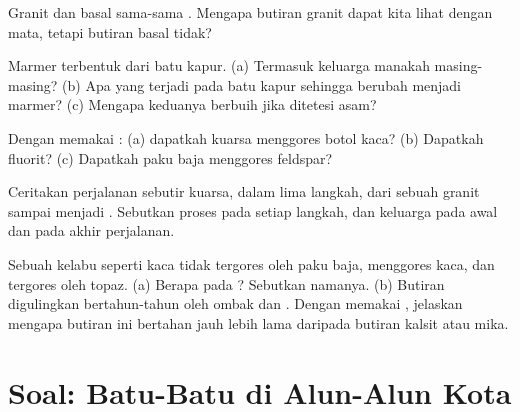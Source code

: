 \begin{exercise}[$\star\star$]\label{exo:g6:rocks-and-minerals:8}
Granit dan basal sama-sama . Mengapa butiran granit dapat kita
lihat dengan mata, tetapi butiran basal tidak?
\end{exercise}

\begin{exercise}[$\star\star$]\label{exo:g6:rocks-and-minerals:9}
Marmer terbentuk dari batu kapur. (a) Termasuk keluarga manakah
masing-masing? (b) Apa yang terjadi pada batu kapur sehingga berubah menjadi
marmer? (c) Mengapa keduanya berbuih jika ditetesi asam?
\end{exercise}

\begin{exercise}[$\star\star$]\label{exo:g6:rocks-and-minerals:10}
Dengan memakai : (a) dapatkah kuarsa menggores botol kaca?
(b) Dapatkah fluorit? (c) Dapatkah paku baja menggores feldspar?
\end{exercise}

\begin{exercise}[$\star\star\star$]\label{exo:g6:rocks-and-minerals:11}
Ceritakan perjalanan sebutir kuarsa, dalam lima langkah, dari sebuah 
granit sampai menjadi . Sebutkan proses pada setiap langkah,
dan keluarga  pada awal dan pada akhir perjalanan.
\end{exercise}

\begin{exercise}[$\star\star\star$]\label{exo:g6:rocks-and-minerals:12}
Sebuah  kelabu seperti kaca tidak tergores oleh paku baja, menggores
kaca, dan tergores oleh topaz. (a) Berapa  pada ?
Sebutkan namanya. (b) Butiran  digulingkan bertahun-tahun oleh ombak
dan . Dengan memakai , jelaskan mengapa butiran 
ini bertahan jauh lebih lama daripada butiran kalsit atau mika.
\end{exercise}

\section{Soal: Batu-Batu di Alun-Alun Kota}

